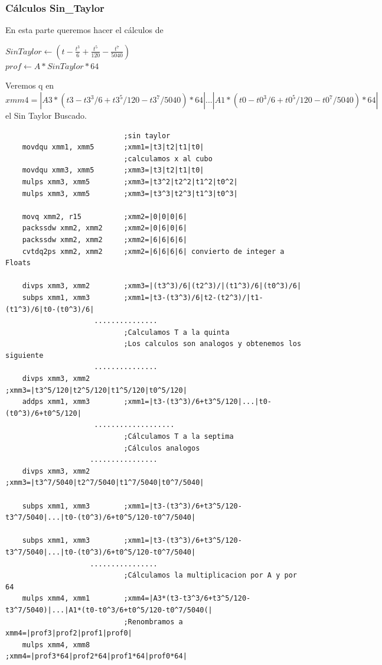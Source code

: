\subsubsection*{Cálculos Sin_Taylor}
En esta parte queremos hacer el cálculos de
\begin{center}
	$SinTaylor \gets (t - \frac{t^3}{6}+\frac{t^5}{120}-\frac{t^7}{5040})$ \\
	$prof \gets A * SinTaylor*64$
\end{center}
Veremos q en $xmm4=|A3*(t3-t3^3/6+t3^5/120-t3^7/5040)*64|...|A1*(t0-t0^3/6+t0^5/120-t0^7/5040)*64|$ el Sin Taylor Buscado.
\begin{codesnippet}
\begin{verbatim}
                            ;sin taylor
    movdqu xmm1, xmm5       ;xmm1=|t3|t2|t1|t0|
                            ;calculamos x al cubo
    movdqu xmm3, xmm5       ;xmm3=|t3|t2|t1|t0|
    mulps xmm3, xmm5        ;xmm3=|t3^2|t2^2|t1^2|t0^2|
    mulps xmm3, xmm5        ;xmm3=|t3^3|t2^3|t1^3|t0^3|	

    movq xmm2, r15          ;xmm2=|0|0|0|6|
    packssdw xmm2, xmm2     ;xmm2=|0|6|0|6|
    packssdw xmm2, xmm2     ;xmm2=|6|6|6|6|
    cvtdq2ps xmm2, xmm2	    ;xmm2=|6|6|6|6| convierto de integer a Floats

    divps xmm3, xmm2        ;xmm3=|(t3^3)/6|(t2^3)/|(t1^3)/6|(t0^3)/6|
    subps xmm1, xmm3        ;xmm1=|t3-(t3^3)/6|t2-(t2^3)/|t1-(t1^3)/6|t0-(t0^3)/6|
                     ...............                  
                            ;Calculamos T a la quinta
                            ;Los calculos son analogos y obtenemos los siguiente
                     ...............
    divps xmm3, xmm2        ;xmm3=|t3^5/120|t2^5/120|t1^5/120|t0^5/120|								
    addps xmm1, xmm3        ;xmm1=|t3-(t3^3)/6+t3^5/120|...|t0-(t0^3)/6+t0^5/120|								
                     ................... 
                            ;Cálculamos T a la septima
                            ;Cálculos analogos
                    ................	
    divps xmm3, xmm2        ;xmm3=|t3^7/5040|t2^7/5040|t1^7/5040|t0^7/5040|
                    
    subps xmm1, xmm3        ;xmm1=|t3-(t3^3)/6+t3^5/120-t3^7/5040|...|t0-(t0^3)/6+t0^5/120-t0^7/5040|

    subps xmm1, xmm3        ;xmm1=|t3-(t3^3)/6+t3^5/120-t3^7/5040|...|t0-(t0^3)/6+t0^5/120-t0^7/5040|								
                    ................
                            ;Cálculamos la multiplicacion por A y por 64
    mulps xmm4, xmm1        ;xmm4=|A3*(t3-t3^3/6+t3^5/120-t3^7/5040)|...|A1*(t0-t0^3/6+t0^5/120-t0^7/5040(|
                            ;Renombramos a xmm4=|prof3|prof2|prof1|prof0|		
    mulps xmm4, xmm8        ;xmm4=|prof3*64|prof2*64|prof1*64|prof0*64|

\end{verbatim}
\end{codesnippet}

